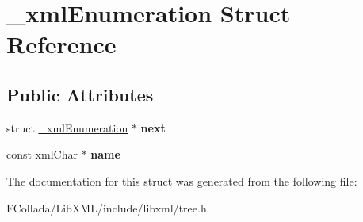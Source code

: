 \hypertarget{struct__xmlEnumeration}{
\section{\_\-xmlEnumeration Struct Reference}
\label{struct__xmlEnumeration}
}
\subsection*{Public Attributes}
\begin{DoxyCompactItemize}
\item 
\hypertarget{struct__xmlEnumeration_a168deadc881e76af7e2ead0a1348f8cb}{
struct \hyperlink{struct__xmlEnumeration}{\_\-xmlEnumeration} $\ast$ {\bfseries next}}
\label{struct__xmlEnumeration_a168deadc881e76af7e2ead0a1348f8cb}

\item 
\hypertarget{struct__xmlEnumeration_ac88e7e3719444b48a74d79a374455d5f}{
const xmlChar $\ast$ {\bfseries name}}
\label{struct__xmlEnumeration_ac88e7e3719444b48a74d79a374455d5f}

\end{DoxyCompactItemize}


The documentation for this struct was generated from the following file:\begin{DoxyCompactItemize}
\item 
FCollada/LibXML/include/libxml/tree.h\end{DoxyCompactItemize}
